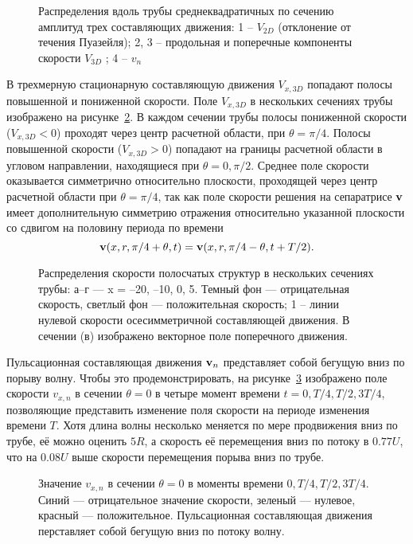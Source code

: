 \begin{figure}[h]
\caption{Распределения вдоль трубы среднеквадратичных по сечению амплитуд трех
составляющих движения: 1 – $V_{2D}$ (отклонение от течения Пуазейля); 2, 3 – продольная и поперечные компоненты скорости $V_{3D}$ ; 4 – $v_{n}$}
\label{amp_pic}
\end{figure}


В трехмерную стационарную составляющую движения $V_{x,3D}$ попадают полосы повышенной и пониженной скорости. Поле $V_{x,3D}$ в нескольких сечениях трубы изображено на рисунке~\ref{V3D_cs_pic}. В каждом сечении трубы полосы пониженной скорости ($V_{x,3D} < 0$) проходят через центр расчетной области, при $\theta = \pi/4$. Полосы повышенной скорости ($V_{x,3D} > 0$) попадают на границы расчетной области в угловом направлении, находящиеся при $\theta = 0, \pi/2$. Среднее поле скорости оказывается симметрично относительно плоскости, проходящей через центр расчетной области при $\theta = \pi/4$, так как поле скорости решения на сепаратрисе $\mathbf{v}$ имеет дополнительную симметрию отражения относительно указанной плоскости со сдвигом на половину периода по времени
\begin{equation}
\mathbf{v}(x, r, \pi/4 + \theta, t) = \mathbf{v}(x, r, \pi/4 - \theta, t + T/2). 
\end{equation} 


\begin{figure}[h]
\caption{Распределения скорости полосчатых структур в нескольких сечениях трубы:
а–г --- x = –20, –10, 0, 5. Темный фон --- отрицательная скорость, светлый фон --- положительная скорость; 1 – линии нулевой скорости осесимметричной составляющей движения. В сечении (в) изображено векторное поле поперечного движения.}
\label{V3D_cs_pic}
\end{figure}

Пульсационная составляющая движения $\mathbf{v}_n$ представляет собой бегущую вниз по порыву волну. Чтобы это продемонстрировать, на рисунке~\ref{puls_ls_pic} изображено поле скорости $v_{x,n}$ в сечении $\theta = 0$ в четыре момент времени $t=0, T/4, T/2, 3T/4$, позволяющие представить изменение поля скорости на периоде изменения времени $T$. Хотя длина волны несколько меняется по мере продвижения вниз по трубе, её можно оценить $5R$, а скорость её перемещения вниз по потоку в $0.77U$, что на $0.08U$ выше скорости перемещения порыва вниз по трубе.  


\begin{figure}[h]
\caption{Значение $v_{x,n}$ в сечении $\theta=0$ в моменты времени $0, T/4, T/2, 3T/4$. Синий --- отрицательное значение скорости, зеленый --- нулевое, красный --- положительное. Пульсационная составляющая движения перставляет собой бегущую вниз по потоку волну. }
\label{puls_ls_pic}
\end{figure}

